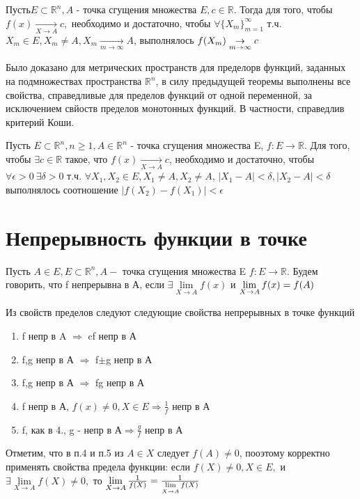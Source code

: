 \begin{theorem}
	Пусть$ E \subset \mathbb{R}^n, A $ - точка сгущения множества $E, c \in \mathbb{R}$. Тогда для того, чтобы $f(x) \underset{X \to A}{\to} c, $ необходимо и достаточно, чтобы $\forall \{X_m\}_{m=1}^{\infty}$ т.ч.$ X_m \in E, X_m \neq A, X_m \underset{m \to \infty}{\to} A$, выполнялось $f(X_m) \underset{m \to \infty}{\to} c \\$
\end{theorem}
Было доказано для метрических пространств для пределорв функций, заданных на подмножествах пространства $\mathbb{R}^n$, в силу предыдущей теоремы выполнены все свойства, справедливые для пределов функций от одной переменной, за исключением свйоств пределов монотонных функций. В частности, справедлив критерий Коши.
\begin{theorem}
	Пусть $E \subset \mathbb{R}^n, n \geq 1, A \in \mathbb{R}^n$ - точка сгущения множества E, $f: E \to \mathbb{R}.$ Для того, чтобы $\exists c \in \mathbb{R}$ такое, что $f(x) \underset{X \to A}{\to} c$, необходимо и достаточно, чтобы $\forall \epsilon > 0 \  \exists \delta > 0$ т.ч. $\forall X_1,X_2 \in E, X_1 \neq A, X_2 \neq A $, $|X_1 - A| < \delta, |X_2-A| < \delta$ выполнялось соотношение $|f(X_2)-f(X_1)|<\epsilon$
 \end{theorem}
\section{Непрерывность функции в точке}
\begin{definition} Пусть $A \in E, E \subset \mathbb{R}^n,A -$ точка сгущения множества E $f: E \to \mathbb{R}$. Будем говорить, что f непрерывна в А, если $\exists \lim\limits_{X \to A}{f(x)}$ и $\lim\limits_{X \to A}{f(x)} = f(A) \\$
\end{definition}
Из свойств пределов следуют следующие свойства непрерывных в точке функций

\begin{property}
	\begin{enumerate}
		\item f непр в A $\Rightarrow$ cf непр в А
		\item f,g непр в А $\Rightarrow$ f$\pm$g непр в А
		\item f,g непр в А $\Rightarrow$ fg непр в А
		\item f непр в А, $f(x) \neq 0, X \in E \Rightarrow \frac{1}{f}$ непр в А
		\item f, как в 4., g - непр в $А \Rightarrow \frac{g}{f}$ непр в А
	\end{enumerate}
\end{property}
Отметим, что в п.4 и п.5 из $A \in X$ следует $f(A) \neq 0$, пооэтому корректно применять свойства предела функции: если $f(X) \neq 0, X \in E,$ и $\exists \lim\limits_{X \to A}{f(X) \neq 0},$ то $\lim\limits_{X \to A}{\frac{1}{f(X)}} = \frac{1}{\lim\limits_{X \to A}{f(X)}} \\$

